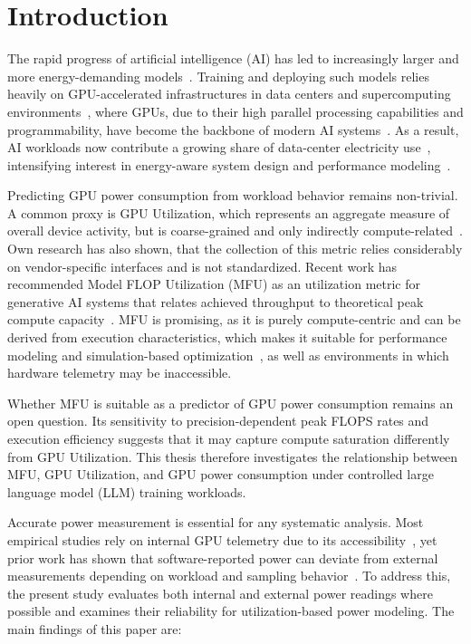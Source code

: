 \documentclass[runningheads]{llncs}
\begin{document}

\section{Introduction}
The rapid progress of artificial intelligence (AI) has led to increasingly larger and more energy-demanding models~\cite{yang-2024B}. Training and deploying such models relies heavily on GPU-accelerated infrastructures in data centers and supercomputing environments~\cite{fernandez-2024,pope-2022}, where
GPUs, due to their high parallel processing capabilities and programmability, have become the backbone of modern AI systems~\cite{jahanshahi-2020}.
As a result, AI workloads now contribute a growing share of data-center electricity use~\cite{international-energy-agency-2025}, intensifying interest in energy-aware system design and performance modeling~\cite{katsenou-2024, google-2024}.

Predicting GPU power consumption from workload behavior remains non-trivial. A common proxy is GPU Utilization, which represents an aggregate measure of overall device activity, but is coarse-grained and only indirectly compute-related~\cite{cornelius-2025}. Own research has also shown, that the collection of this metric relies considerably on vendor-specific interfaces and is not standardized.
Recent work has recommended Model FLOP Utilization (MFU) as an utilization metric for generative AI systems that relates achieved throughput to theoretical peak compute capacity~\cite{chowdhery-2023}. 
MFU is promising, as it is purely compute-centric and can be derived from execution characteristics, which makes it suitable for performance modeling and simulation-based optimization~\cite{ozcan-2025}, as well as environments in which hardware telemetry may be inaccessible.

Whether MFU is suitable as a predictor of GPU power consumption remains an open question. Its sensitivity to precision-dependent peak FLOPS rates and execution efficiency suggests that it may capture compute saturation differently from GPU Utilization. This thesis therefore investigates the relationship between MFU, GPU Utilization, and GPU power consumption under controlled large language model (LLM) training workloads.

Accurate power measurement is essential for any systematic analysis. Most empirical studies rely on internal GPU telemetry due to its accessibility~\cite{cornelius-2025}, yet prior work has shown that software-reported power can deviate from external measurements depending on workload and sampling behavior~\cite{yang-2024B}. To address this, the present study evaluates both internal and external power readings where possible and examines their reliability for utilization-based power modeling. The main findings of this paper are:
\end{document}
